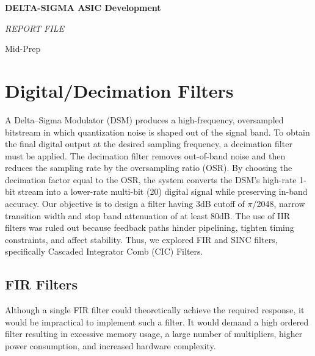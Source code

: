 \documentclass[11pt,onecolumn]{IEEEtran}
\begin{document}
\begin{titlepage}
    \centering
    {\Huge \textbf{DELTA-SIGMA ASIC Development} \par}
    \vspace{2cm}
    {\Large \textit{REPORT FILE} \par}
    \vspace{1cm}
    {\Large Mid-Prep\par} 
    \vspace{1cm}
    \vfill
\end{titlepage}

\tableofcontents  %

\newpage  %

\author{}
\date{}

\section{\textbf{Digital/Decimation Filters}}
A Delta–Sigma Modulator (DSM) produces a high-frequency, oversampled bitstream in which quantization noise is shaped out of the signal band. To obtain the final digital output at the desired sampling frequency, a decimation filter must be applied. The decimation filter removes out-of-band noise and then reduces the sampling rate by the oversampling ratio (OSR). By choosing the decimation factor equal to the OSR, the system converts the DSM’s high-rate 1-bit stream into a lower-rate multi-bit (20) digital signal while preserving in-band accuracy.
\newline
\indent Our objective is to design a filter having 3dB cutoff of $\pi$/2048, narrow transition width and stop band attenuation of at least 80dB.
The use of IIR filters was ruled out because feedback paths hinder pipelining, tighten timing constraints, and affect stability. Thus, we explored FIR and SINC filters, specifically Cascaded Integrator Comb (CIC) Filters.

\subsection{\textbf{FIR Filters}} 

Although a single FIR filter could theoretically achieve the required response, it would be impractical to implement such a filter. It would demand a high ordered filter resulting in excessive memory usage, a large number of multipliers, higher power consumption, and increased hardware complexity. 
\end{document}

